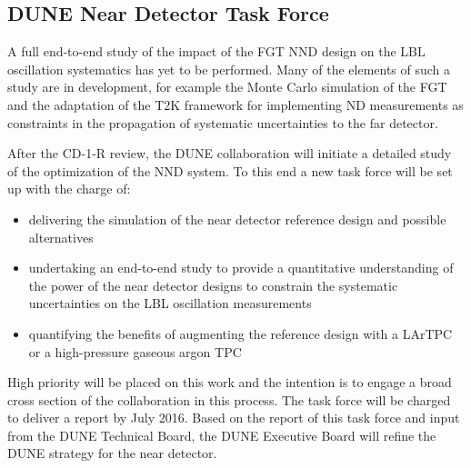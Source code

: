 \subsection{DUNE Near Detector Task Force}

A full end-to-end study of the impact of the FGT NND design on the LBL oscillation 
systematics has yet to be performed. Many of the elements of such a study are in 
development, for example the Monte Carlo simulation of the FGT and the adaptation 
of the T2K framework for implementing ND measurements as constraints in the propagation 
of systematic uncertainties to the far detector. 

After the CD-1-R review, the DUNE collaboration will initiate a detailed study 
of the optimization of the NND system. To this end a new task force will be set 
up with the charge of:

\begin{itemize}
\item delivering the simulation of the near detector reference design and possible alternatives

\item undertaking an end-to-end study to provide a quantitative understanding of 
the power of the near detector designs to constrain the systematic uncertainties on the LBL 
oscillation measurements

\item quantifying the benefits of augmenting the reference design with a LArTPC 
or a high-pressure gaseous argon TPC
\end{itemize}

High priority will be placed on this work and the intention is to engage a broad 
cross section of the collaboration in this process. The task force will be charged 
to deliver a report by July 2016. Based on the report of this task force and input 
from the DUNE Technical Board, the DUNE Executive Board will refine the DUNE strategy 
for the near detector.


